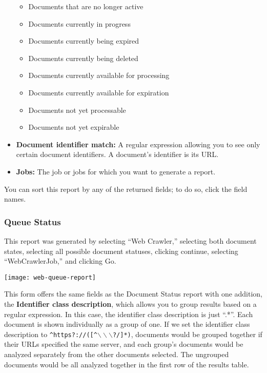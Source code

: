 \begin{changemargin}{1.5in}{0in}
\begin{itemize}
\begin{itemize}
\item Documents that are no longer active

\item Documents currently in progress

\item Documents currently being expired

\item Documents currently being deleted

\item Documents currently available for processing

\item Documents currently available for expiration

\item Documents not yet processable

\item Documents not yet expirable

\end{itemize}

\item \textbf{Document identifier match:} A regular expression
allowing you to see only certain document identifiers. A document's
identifier is its URL.

\item \textbf{Jobs:} The job or jobs for which you want to generate
a report.

\end{itemize}

You can sort this report by any of the returned fields; to do so,
click the field names.

\subsubsection{Queue Status}

This report was generated by selecting ``Web Crawler,'' selecting both
document states, selecting all possible document statuses, clicking
continue, selecting ``WebCrawlerJob,'' and clicking Go.

\texttt{[image: web-queue-report]}

This form offers the same fields as the Document Status report with
one addition, the \textbf{Identifier class description}, which allows
you to group results based on a regular expression. In this case, the
identifier class description is just ``.*''. Each document is shown
individually as a group of one. If we set the identifier class
description to
\texttt{\^{}https?://([\^{}$\backslash\backslash\backslash$?/]*)},
documents would be grouped together if their URLs specified the same
server, and each group's documents would be analyzed separately from
the other documents selected. The ungrouped documents would be all
analyzed together in the first row of the results table.


\end{changemargin}
